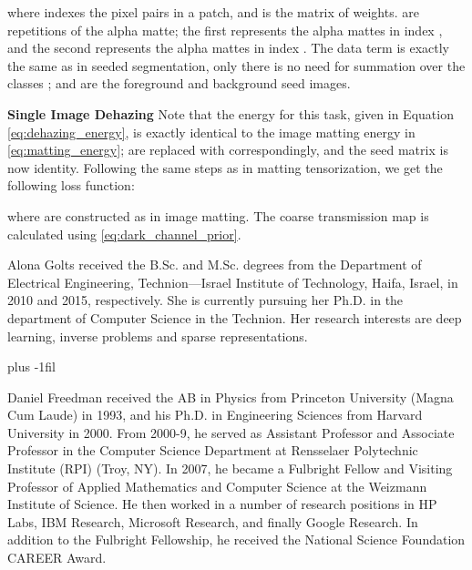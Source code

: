 \documentclass[journal]{IEEEtran}
\newcommand{\smallpar}[1]{\textbf{#1}\hspace{0.2cm}}
\begin{document}
where  indexes the pixel pairs  in a  patch, and  is the matrix of weights.  are repetitions of the alpha matte; the first represents the alpha mattes in index , and the second represents the alpha mattes in index . The data term is exactly the same as in seeded segmentation, only there is no need for summation over the classes ;  and  are the foreground and background seed images.

\smallpar{Single Image Dehazing}
Note that the energy for this task, given in Equation \ref{eq:dehazing_energy}, is exactly identical to the image matting energy in \ref{eq:matting_energy};  are replaced with  correspondingly, and the seed matrix  is now identity. Following the same steps as in matting tensorization, we get the following loss function:

where  are constructed as  in image matting. The coarse transmission map  is calculated using \ref{eq:dark_channel_prior}.







\ifCLASSOPTIONcaptionsoff
  \newpage
\fi




\begin{IEEEbiography}{Alona Golts}
received the B.Sc. and M.Sc. degrees from the Department of Electrical Engineering, Technion—Israel Institute of Technology, Haifa, Israel, in 2010 and 2015, respectively. She is
currently pursuing her Ph.D. in the department of Computer Science in the Technion. Her research interests are deep learning, inverse problems and sparse representations.
\end{IEEEbiography}

\vskip -20pt plus -1fil

\begin{IEEEbiography}{Daniel Freedman}
received the AB in Physics from Princeton University (Magna Cum Laude) in 1993, and his Ph.D. in Engineering Sciences from Harvard University in 2000. From 2000-9, he served as Assistant Professor and Associate Professor in the Computer Science Department at Rensselaer Polytechnic Institute (RPI) (Troy, NY). In 2007, he became a Fulbright Fellow and Visiting Professor of Applied Mathematics and Computer Science at the Weizmann Institute of Science. He then worked in a number of research positions in HP Labs, IBM Research, Microsoft Research, and finally Google Research. In addition to the Fulbright Fellowship, he received the National Science Foundation CAREER Award.
\end{IEEEbiography}
\end{document}
